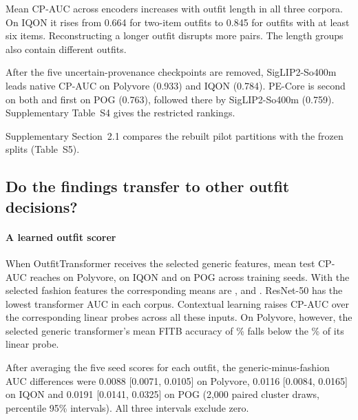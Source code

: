 
Mean CP-AUC across encoders increases with outfit length in all three corpora. On IQON it rises from 0.664 for two-item outfits to 0.845 for outfits with at least six items. Reconstructing a longer outfit disrupts more pairs. The length groups also contain different outfits.

After the five uncertain-provenance checkpoints are removed, SigLIP2-So400m leads native CP-AUC on Polyvore (0.933) and IQON (0.784). PE-Core is second on both and first on POG (0.763), followed there by SigLIP2-So400m (0.759). Supplementary Table~S4 gives the restricted rankings.

Supplementary Section~2.1 compares the rebuilt pilot partitions with the frozen splits (Table~S5).


\subsection{Do the findings transfer to other outfit decisions?}
\paragraph{A learned outfit scorer}
When OutfitTransformer receives the selected generic features, mean test CP-AUC reaches \resOtPolyvoreVTwoCleanGenericTestCpAucMean{} on Polyvore, \resOtIqonThreeZeroZeroZeroVTwoCleanGenericTestCpAucMean{} on IQON and \resOtPogVTwoCleanGenericTestCpAucMean{} on POG across training seeds. With the selected fashion features the corresponding means are \resOtPolyvoreVTwoCleanFashionTestCpAucMean{}, \resOtIqonThreeZeroZeroZeroVTwoCleanFashionTestCpAucMean{} and \resOtPogVTwoCleanFashionTestCpAucMean{}. ResNet-50 has the lowest transformer AUC in each corpus. Contextual learning raises CP-AUC over the corresponding linear probes across all these inputs. On Polyvore, however, the selected generic transformer's mean FITB accuracy of \resOtPolyvoreVTwoCleanGenericTestFitbAccMean{}\% falls below the \resPolyvoreVTwoCleanSiglipTwoSoFourZeroZeromThreeEightFourNativeLogisticTestFitbAcc{}\% of its linear probe. 

After averaging the five seed scores for each outfit, the generic-minus-fashion AUC differences were 0.0088 [0.0071, 0.0105] on Polyvore, 0.0116 [0.0084, 0.0165] on IQON and 0.0191 [0.0141, 0.0325] on POG (2,000 paired cluster draws, percentile 95\% intervals). All three intervals exclude zero.
\showContext

